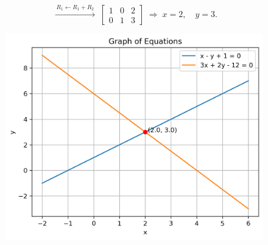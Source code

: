 \documentclass[journal]{IEEEtran}
\begin{document}
\[
\;\xrightarrow{\,R_1 \leftarrow R_1 + R_2\,}\;
\left[
\begin{array}{cc|c}
	1 & 0 & 2\\
	0 & 1 & 3
\end{array}
\right]
\;\Longrightarrow\;
x = 2,\quad y = 3.
\]


\begin{figure}
	\centering
	\includegraphics[width=1\linewidth]{figs/equations_solution}
	\caption{}
	\label{fig:equationssolution}
\end{figure}
\end{document}
